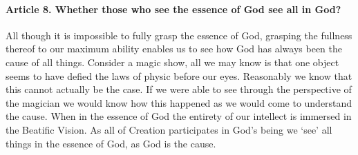 \documentclass{ucetd}
\begin{document}
\paragraph{Article 8. Whether those who see the essence of God see all in God?}
All though it is impossible to fully grasp the essence of God, grasping the fullness thereof to our maximum ability enables us to see how God has always been the cause of all things. Consider a magic show, all we may know is that one object seems to have defied the laws of physic before our eyes. Reasonably we know that this cannot actually be the case. If we were able to see through the perspective of the magician we would know how this happened as we would come to understand the cause. When in the essence of God the entirety of our intellect is immersed in the Beatific Vision. As all of Creation participates in God's being we `see' all things in the essence of God, as God is the cause.
\end{document}
